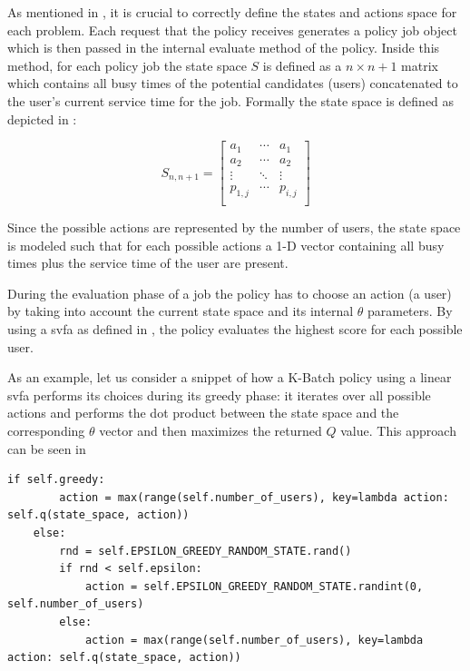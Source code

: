 \documentclass[draft=false]{seal_thesis}
\begin{document}
As mentioned in , it is crucial to correctly define the states and actions space for each problem. Each request that the policy receives generates a policy job object which is then passed in the internal evaluate method of the policy. Inside this method, for each policy job the state space $S$ is defined as a $n \times n+1$ matrix which contains all busy times of the potential candidates (\ie users) concatenated to the user's current service time for the job. Formally the state space is defined as depicted in :

\begin{equation}
\label{eq:kbatch_sp}
	S_{n,n+1} = 
	\begin{bmatrix}
	a_1 & \cdots & a_1 \\
	a_2 & \cdots & a_2 \\
	\vdots & \ddots & \vdots \\
	p_{1,j} & \cdots & p_{i,j} \\
	\end{bmatrix}
\end{equation}

Since the possible actions are represented by the number of users, the state space is modeled such that for each possible actions a 1-D vector containing all busy times plus the service time of the user are present.

During the evaluation phase of a job the policy has to choose an action (\ie a user) by taking into account the current state space and its internal $\theta$ parameters. By using a \gls{svfa} as defined in , the policy evaluates the highest score for each possible user.

As an example, let us consider a snippet of how a K-Batch policy using a linear \gls{svfa} performs its choices during its greedy phase: it iterates over all possible actions and performs the dot product between the state space and the corresponding $\theta$ vector and then maximizes the returned $Q$ value. This approach can be seen in  

\begin{lstlisting}[caption=\gls{ep} approach,label=lst:e_greedy,style=CustomPython]
    if self.greedy:
        action = max(range(self.number_of_users), key=lambda action: self.q(state_space, action))
    else:
        rnd = self.EPSILON_GREEDY_RANDOM_STATE.rand()
        if rnd < self.epsilon:
            action = self.EPSILON_GREEDY_RANDOM_STATE.randint(0, self.number_of_users)
        else:
            action = max(range(self.number_of_users), key=lambda action: self.q(state_space, action))
\end{lstlisting}
\end{document}
